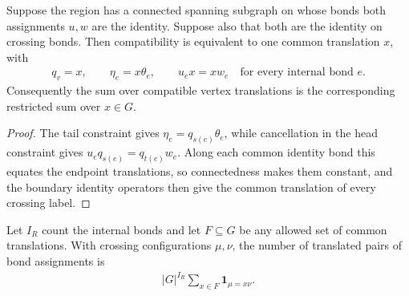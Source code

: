 \begin{lemma}%
    \label{thm:peps_regular_twisted_synchronization}
    \leanok
    Suppose the region has a connected spanning subgraph on whose bonds
    both assignments $u,w$ are the identity. Suppose also that both are
    the identity on crossing bonds. Then compatibility is equivalent to
    one common translation $x$, with
    \begin{align}
        q_v=x,\qquad \eta_e=x\theta_e,\qquad
        u_ex=xw_e\quad\text{for every internal bond }e.
    \end{align}
    Consequently the sum over compatible vertex translations is the
    corresponding restricted sum over $x\in G$.
\end{lemma}

\begin{proof}\leanok
    The tail constraint gives $\eta_e=q_{s(e)}\theta_e$, while cancellation
    in the head constraint gives $u_eq_{s(e)}=q_{t(e)}w_e$.
    Along each common identity bond this equates the endpoint translations,
    so connectedness makes them constant, and the boundary identity operators then
    give the common translation of every crossing label.
\end{proof}

\begin{lemma}%
    \label{thm:peps_regular_twisted_boundary_count}
    \leanok
    Let $I_R$ count the internal bonds and let $F\subseteq G$ be any
    allowed set of common translations. With crossing configurations
    $\mu,\nu$, the number of translated pairs of bond assignments is
    \begin{align}
        |G|^{I_R}\sum_{x\in F}\mathbf{1}_{\mu=x\nu}.
    \end{align}
\end{lemma}

